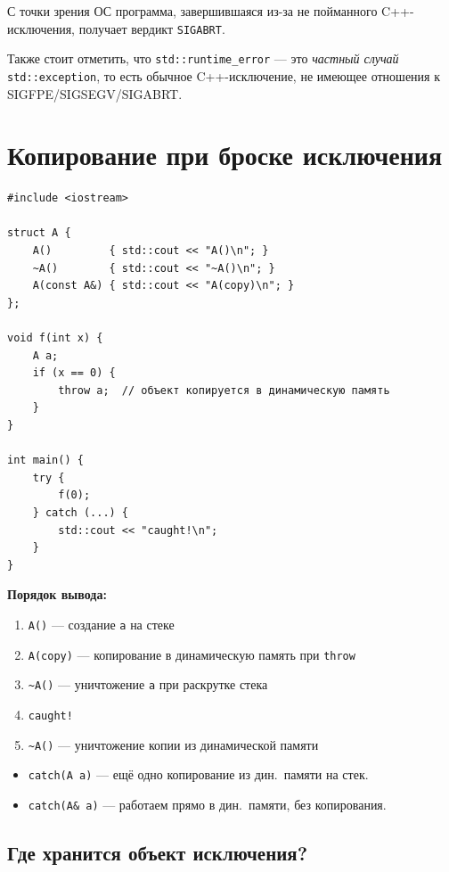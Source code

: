 \documentclass[a4paper,12pt]{article}
\begin{document}
С точки зрения ОС программа, завершившаяся из-за не пойманного C++-исключения,
получает вердикт \texttt{SIGABRT}.

Также стоит отметить, что \texttt{std::runtime\_error} ---
это \textit{частный случай} \texttt{std::exception}, то есть обычное
C++-исключение, не имеющее отношения к SIGFPE/SIGSEGV/SIGABRT.

\section{Копирование при броске исключения}

\begin{lstlisting}
#include <iostream>

struct A {
    A()         { std::cout << "A()\n"; }
    ~A()        { std::cout << "~A()\n"; }
    A(const A&) { std::cout << "A(copy)\n"; }
};

void f(int x) {
    A a;
    if (x == 0) {
        throw a;  // объект копируется в динамическую память
    }
}

int main() {
    try {
        f(0);
    } catch (...) {
        std::cout << "caught!\n";
    }
}
\end{lstlisting}

\textbf{Порядок вывода:}
\begin{enumerate}
    \item \texttt{A()} --- создание \texttt{a} на стеке
    \item \texttt{A(copy)} --- копирование в динамическую память при \texttt{throw}
    \item \texttt{\textasciitilde A()} --- уничтожение \texttt{a} при раскрутке стека
    \item \texttt{caught!}
    \item \texttt{\textasciitilde A()} --- уничтожение копии из динамической памяти
\end{enumerate}

\medskip
\begin{itemize}
    \item \texttt{catch(A a)} --- ещё одно копирование из дин.\ памяти на стек.
    \item \texttt{catch(A\& a)} --- работаем прямо в дин.\ памяти, без копирования.
\end{itemize}

\subsection{Где хранится объект исключения?}
\end{document}

